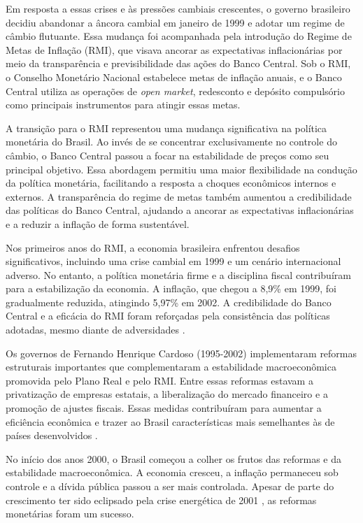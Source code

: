 \documentclass[12pt,oneside,a4paper,chapter=TITLE,english,brazil,sumario=abnt-6027-2012]{abntex2}
\begin{document}
Em resposta a essas crises e às pressões cambiais crescentes, o governo brasileiro decidiu abandonar a âncora cambial em janeiro de 1999 e adotar um regime de câmbio flutuante. Essa mudança foi acompanhada pela introdução do Regime de Metas de Inflação (RMI), que visava ancorar as expectativas inflacionárias por meio da transparência e previsibilidade das ações do Banco Central. Sob o RMI, o Conselho Monetário Nacional estabelece metas de inflação anuais, e o Banco Central utiliza as operações de \textit{open market}, redesconto e depósito compulsório como  principais instrumentos para atingir essas metas.

A transição para o RMI representou uma mudança significativa na política monetária do Brasil. Ao invés de se concentrar exclusivamente no controle do câmbio, o Banco Central passou a focar na estabilidade de preços como seu principal objetivo. Essa abordagem permitiu uma maior flexibilidade na condução da política monetária, facilitando a resposta a choques econômicos internos e externos. A transparência do regime de metas também aumentou a credibilidade das políticas do Banco Central, ajudando a ancorar as expectativas inflacionárias e a reduzir a inflação de forma sustentável.

Nos primeiros anos do RMI, a economia brasileira enfrentou desafios significativos, incluindo uma crise cambial em 1999 e um cenário internacional adverso. No entanto, a política monetária firme e a disciplina fiscal contribuíram para a estabilização da economia. A inflação, que chegou a 8,9\% em 1999, foi gradualmente reduzida, atingindo 5,97\% em 2002. A credibilidade do Banco Central e a eficácia do RMI foram reforçadas pela consistência das políticas adotadas, mesmo diante de adversidades \cite{fabiogiambiagi_1999_a}.

Os governos de Fernando Henrique Cardoso (1995-2002) implementaram reformas estruturais importantes que complementaram a estabilidade macroeconômica promovida pelo Plano Real e pelo RMI. Entre essas reformas estavam a privatização de empresas estatais, a liberalização do mercado financeiro e a promoção de ajustes fiscais. Essas medidas contribuíram para aumentar a eficiência econômica e trazer ao Brasil características mais semelhantes às de países desenvolvidos \cite{fabiogiambiagi_2016_economia}.

No início dos anos 2000, o Brasil começou a colher os frutos das reformas e da estabilidade macroeconômica. A economia cresceu, a inflação permaneceu sob controle e a dívida pública passou a ser mais controlada. Apesar de parte do crescimento ter sido eclipsado pela crise energética de 2001 \cite{fabiogiambiagi_2016_economia}, as reformas monetárias foram um sucesso.
\end{document}
